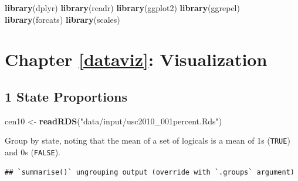 \documentclass[
]{book}
\newenvironment{Shaded}{\begin{snugshade}}{\end{snugshade}}
\newcommand{\DataTypeTok}[1]{\textcolor[rgb]{0.13,0.29,0.53}{#1}}
\newcommand{\DecValTok}[1]{\textcolor[rgb]{0.00,0.00,0.81}{#1}}
\newcommand{\KeywordTok}[1]{\textcolor[rgb]{0.13,0.29,0.53}{\textbf{#1}}}
\newcommand{\NormalTok}[1]{#1}
\newcommand{\OperatorTok}[1]{\textcolor[rgb]{0.81,0.36,0.00}{\textbf{#1}}}
\newcommand{\StringTok}[1]{\textcolor[rgb]{0.31,0.60,0.02}{#1}}
\theoremstyle{definition}
\theoremstyle{definition}
\theoremstyle{definition}
\theoremstyle{definition}
\theoremstyle{remark}
\begin{document}
\begin{Shaded}
\begin{Highlighting}[]
\KeywordTok{library}\NormalTok{(dplyr)}
\KeywordTok{library}\NormalTok{(readr)}
\KeywordTok{library}\NormalTok{(ggplot2)}
\KeywordTok{library}\NormalTok{(ggrepel)}
\KeywordTok{library}\NormalTok{(forcats)}
\KeywordTok{library}\NormalTok{(scales)}
\end{Highlighting}
\end{Shaded}

\hypertarget{chapter-refdataviz-visualization}{%
\section{Chapter \ref{dataviz}: Visualization}\label{chapter-refdataviz-visualization}}

\hypertarget{state-proportions}{%
\subsection*{1 State Proportions}\label{state-proportions}}

\begin{Shaded}
\begin{Highlighting}[]
\NormalTok{cen10 <-}\StringTok{ }\KeywordTok{readRDS}\NormalTok{(}\StringTok{"data/input/usc2010_001percent.Rds"}\NormalTok{)}
\end{Highlighting}
\end{Shaded}

Group by state, noting that the mean of a set of logicals is a mean of 1s (\texttt{TRUE}) and 0s (\texttt{FALSE}).

\begin{Shaded}
\end{Shaded}

\begin{verbatim}
## `summarise()` ungrouping output (override with `.groups` argument)
\end{verbatim}
\end{document}
